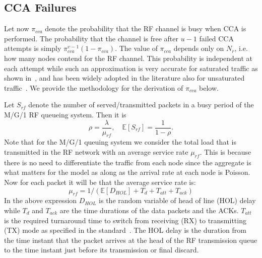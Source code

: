 \documentclass[10pt]{IEEEtran}
\newcounter{section:outage-analysis}
\begin{document}
\subsection{CCA Failures}
Let now $\pi_{cca}$ denote the probability that the RF channel is busy when CCA is performed. The probability that the channel is free after $u-1$ failed CCA attempts is simply $\pi_{cca}^{\upsilon-1}(1-\pi_{cca})$. The value of $\pi_{cca}$ depends only on $N_r$, i.e. how many nodes contend for the RF channel. This probability is independent at each attempt while such an approximation is very accurate for saturated traffic as shown in~\cite{bianchi-80211}, and has been widely adopted in the literature also for unsaturated traffic~\cite{wu02}. We provide the methodology for the derivation of $\pi_{cca}$ below.

Let $S_{rf}$ denote the number of served/transmitted packets in a busy period of the M/G/1 RF queueing system. Then it is
\begin{equation}\label{rho_rf}
\rho=\frac{\lambda}{\mu_{rf}}, \quad \mathbb{E}[S_{rf}]=\frac{1}{1-\rho}.
\end{equation}
Note that for the M/G/1 queuing system we consider the total load that is transmitted in the RF network with an average service rate $\mu_{rf}$. This is because there is no need to differentiate the traffic from each node since the aggregate is what matters for the model as along as the arrival rate at each node is Poisson. Now for each packet it will be that the average service rate is:
\begin{equation}\label{mu_rf}
\mu_{rf}=1/(\mathbb{E}[D_{HOL}]+ T_{d} +T_{att} + T_{ack})
\end{equation}
In the above expression $D_{HOL}$ is the random variable of head of line (HOL) delay while $T_d$ and $T_{ack}$ are the time durations of the data packets and the ACKs. $T_{att}$ is the required turnaround time to switch from receiving (RX) to transmitting (TX) mode as specified in the standard~\cite{IEEE-802154}. The HOL delay is the duration from the time instant that the packet arrives at the head of the RF transmission queue to the time instant just before its transmission or final discard.
\end{document}
